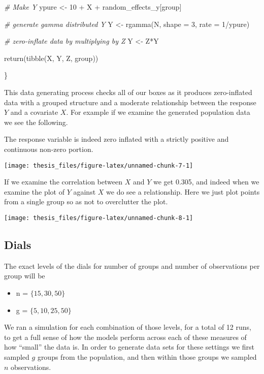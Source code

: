 \documentclass[12pt,twoside]{reedthesis}
\newenvironment{Shaded}{\begin{snugshade}}{\end{snugshade}}
\newcommand{\AttributeTok}[1]{\textcolor[rgb]{0.77,0.63,0.00}{#1}}
\newcommand{\CommentTok}[1]{\textcolor[rgb]{0.56,0.35,0.01}{\textit{#1}}}
\newcommand{\DecValTok}[1]{\textcolor[rgb]{0.00,0.00,0.81}{#1}}
\newcommand{\FunctionTok}[1]{\textcolor[rgb]{0.00,0.00,0.00}{#1}}
\newcommand{\NormalTok}[1]{#1}
\newcommand{\OtherTok}[1]{\textcolor[rgb]{0.56,0.35,0.01}{#1}}
\newcommand{\SpecialCharTok}[1]{\textcolor[rgb]{0.00,0.00,0.00}{#1}}
\providecommand{\tightlist}{%
  \setlength{\itemsep}{0pt}\setlength{\parskip}{0pt}}
\begin{document}
\begin{Shaded}
\begin{Highlighting}[]
  \CommentTok{\# Make Y}
\NormalTok{  ypure }\OtherTok{\textless{}{-}} \DecValTok{10} \SpecialCharTok{+}\NormalTok{ X }\SpecialCharTok{+}\NormalTok{ random\_effects\_y[group] }
    
  \CommentTok{\# generate gamma distributed Y}
\NormalTok{  Y }\OtherTok{\textless{}{-}} \FunctionTok{rgamma}\NormalTok{(N, }\AttributeTok{shape =} \DecValTok{3}\NormalTok{, }\AttributeTok{rate =} \DecValTok{1}\SpecialCharTok{/}\NormalTok{ypure) }
  
  \CommentTok{\# zero{-}inflate data by multiplying by Z}
\NormalTok{  Y }\OtherTok{\textless{}{-}}\NormalTok{ Z}\SpecialCharTok{*}\NormalTok{Y }
  
  \FunctionTok{return}\NormalTok{(}\FunctionTok{tibble}\NormalTok{(X, Y, Z, group))}

\NormalTok{\}}
\end{Highlighting}
\end{Shaded}
This data generating process checks all of our boxes as it produces zero-inflated data with a grouped structure and a moderate relationship between the response \(Y\) and a covariate \(X\). For example if we examine the generated population data we see the following.

The response variable is indeed zero inflated with a strictly positive and continuous non-zero portion.
\begin{center}\texttt{[image: thesis\_files/figure-latex/unnamed-chunk-7-1]} \end{center}

If we examine the correlation between \(X\) and \(Y\) we get 0.305, and indeed when we examine the plot of \(Y\) against \(X\) we do see a relationship. Here we just plot points from a single group so as not to overclutter the plot.
\begin{center}\texttt{[image: thesis\_files/figure-latex/unnamed-chunk-8-1]} \end{center}

\hypertarget{dials}{%
\subsection{Dials}\label{dials}}

The exact levels of the dials for number of groups and number of observations per group will be
\begin{itemize}
\tightlist
\item
  n = \(\{15, 30, 50\}\)
\item
  g = \(\{5, 10, 25, 50\}\)
\end{itemize}
We ran a simulation for each combination of those levels, for a total of 12 runs, to get a full sense of how the models perform across each of these measures of how ``small'' the data is. In order to generate data sets for these settings we first sampled \(g\) groups from the population, and then within those groups we sampled \(n\) observations.
\end{document}
